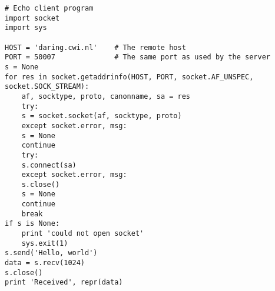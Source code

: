 \begin{verbatim}
# Echo client program
import socket
import sys

HOST = 'daring.cwi.nl'    # The remote host
PORT = 50007              # The same port as used by the server
s = None
for res in socket.getaddrinfo(HOST, PORT, socket.AF_UNSPEC, socket.SOCK_STREAM):
    af, socktype, proto, canonname, sa = res
    try:
	s = socket.socket(af, socktype, proto)
    except socket.error, msg:
	s = None
	continue
    try:
	s.connect(sa)
    except socket.error, msg:
	s.close()
	s = None
	continue
    break
if s is None:
    print 'could not open socket'
    sys.exit(1)
s.send('Hello, world')
data = s.recv(1024)
s.close()
print 'Received', repr(data)
\end{verbatim}
